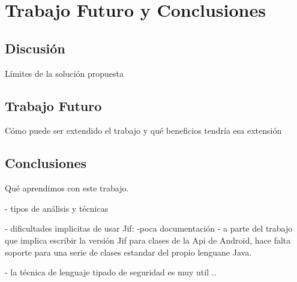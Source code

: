 \label{ch:trabajoFuturo}
\chapter{Trabajo Futuro y Conclusiones}
\section{Discusión}
Límites de la solución propuesta 

\section{Trabajo Futuro}
Cómo puede ser extendido el trabajo y qué beneficios tendría esa extensión 

\section{Conclusiones}
Qué aprendimos con este trabajo.\newline

- tipos de análisis y técnicas

- dificultades implicitas de usar Jif:\newline
-poca documentación
- a parte del trabajo que implica escribir la versión Jif para clases de la Api
de Android, hace falta soporte para una serie de clases estandar del propio
lenguane Java. \newline

- la técnica de lenguaje tipado de seguridad es muy util ..



